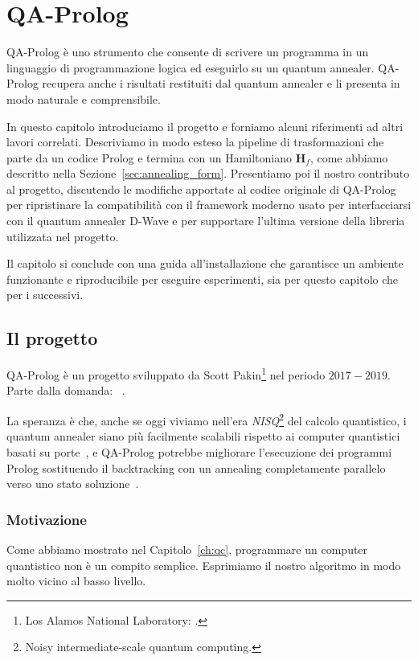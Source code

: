 \chapter{QA-Prolog}
\label{ch:qa_p}
QA-Prolog è uno strumento che consente di scrivere un programma in un linguaggio di programmazione logica ed eseguirlo su un quantum annealer. QA-Prolog recupera anche i risultati restituiti dal quantum annealer e li presenta in modo naturale e comprensibile.

In questo capitolo introduciamo il progetto e forniamo alcuni riferimenti ad altri lavori correlati. Descriviamo in modo esteso la pipeline di trasformazioni che parte da un codice Prolog e termina con un Hamiltoniano $\mathbf{H}_f$, come abbiamo descritto nella Sezione~\ref{sec:annealing_form}. Presentiamo poi il nostro contributo al progetto, discutendo le modifiche apportate al codice originale di QA-Prolog per ripristinare la compatibilità con il framework moderno usato per interfacciarsi con il quantum annealer D-Wave e per supportare l'ultima versione della libreria utilizzata nel progetto.

Il capitolo si conclude con una guida all'installazione che garantisce un ambiente funzionante e riproducibile per eseguire esperimenti, sia per questo capitolo che per i successivi.

\section{Il progetto}
QA-Prolog è un progetto sviluppato da Scott Pakin\footnote{Los Alamos National Laboratory: .} nel periodo $2017-2019$. Parte dalla domanda: ~\cite{pakin2018performing}. 

La speranza è che, anche se oggi viviamo nell'era \emph{NISQ}\footnote{Noisy intermediate-scale quantum computing.} del calcolo quantistico, i quantum annealer siano più facilmente scalabili rispetto ai computer quantistici basati su porte~\cite{kaminsky2004scalable}, e QA-Prolog potrebbe migliorare l'esecuzione dei programmi Prolog sostituendo il backtracking con un annealing completamente parallelo verso uno stato soluzione~\cite{lanl_QA_Prolog}.

\subsection{Motivazione}
Come abbiamo mostrato nel Capitolo~\ref{ch:qc}, programmare un computer quantistico non è un compito semplice. Esprimiamo il nostro algoritmo in modo molto vicino al basso livello.

